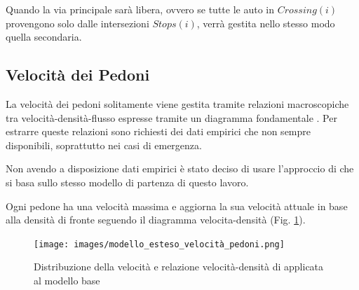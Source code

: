 Quando la via principale sarà libera, ovvero se tutte le auto in $\textit{Crossing}(i)$ provengono solo dalle intersezioni $\textit{Stops}(i)$, verrà gestita nello stesso modo quella secondaria.

\subsection{Velocità dei Pedoni}
La velocità dei pedoni solitamente viene gestita tramite relazioni macroscopiche tra velocità-densità-flusso
espresse tramite un diagramma fondamentale \parencite{nikolic2016probabilistic}.
Per estrarre queste relazioni sono richiesti dei dati empirici che non sempre disponibili, soprattutto nei casi di emergenza.

Non avendo a disposizione dati empirici è stato deciso di usare l'approccio di \textcite{wang2021novel}
che si basa sullo stesso modello di partenza di questo lavoro.

Ogni pedone ha una velocità massima e aggiorna la sua velocità attuale in base alla densità di fronte 
seguendo il diagramma velocita-densità (Fig. \ref{fig:modello-esteso-velocita-pedoni}).

\begin{figure}[ht]
    \centering
    \texttt{[image: images/modello\_esteso\_velocità\_pedoni.png]}
    \caption{Distribuzione della velocità e relazione velocità-densità di \textcite{wang2021novel} applicata al modello base}
    \label{fig:modello-esteso-velocita-pedoni}
\end{figure}

\pagebreak
